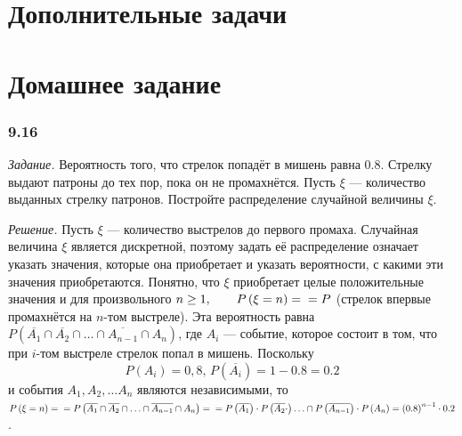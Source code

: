 \section*{Дополнительные задачи}

\section*{Домашнее задание}

\subsubsection*{9.16}

\textit{Задание.} Вероятность того, что стрелок попадёт в мишень равна $0.8$.
Стрелку выдают патроны до тех пор, пока он не промахнётся.
Пусть $ \xi $ --- количество выданных стрелку патронов.
Постройте распределение случайной величины $ \xi $.

\textit{Решение.} Пусть $ \xi $ --- количество выстрелов до первого промаха.
Случайная величина $ \xi $ является дискретной,
поэтому задать её распределение означает указать значения, которые она приобретает и указать вероятности, с какими эти значения приобретаются.
Понятно, что $ \xi $ приобретает целые положительные значения и для произвольного $n \geq 1, \qquad P \left( \xi = n \right) = \\
= P$
(стрелок впервые промахнётся на $n$-том выстреле).
Эта вероятность равна $P \left( \overline{A_1} \cap \overline{A_2} \cap \dotsc \cap \overline{A_{n-1}} \cap A_n \right) $,
где $A_i$ --- событие, которое состоит в том, что при $i$-том выстреле стрелок попал в мишень.
Поскольку
$$P \left( A_i \right) = 0,8, \,
P \left( \overline{A_i} \right) = 1 - 0.8 = 0.2$$
и события $A_1, A_2, \dotsc A_n$ являются независимыми,
то
$P \left( \xi = n \right) = \\
= P \left( \overline{A_1} \cap \overline{A_2} \cap \dotsc \cap \overline{A_{n-1}} \cap A_n \right) = \\
= P \left( \overline{A_1} \right) \cdot P \left( \overline{A_2} \cdot \right) \dotsc \cap P \left( \overline{A_{n-1}} \right) \cdot P \left( A_n \right) =
\left( 0.8 \right)^{n-1} \cdot 0.2$.
